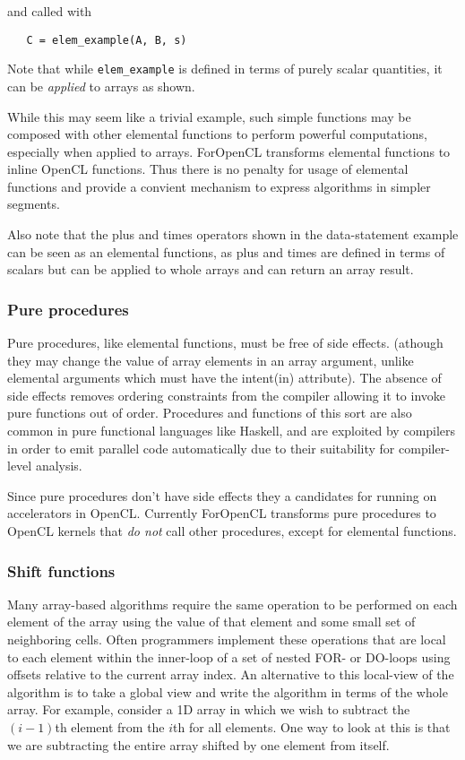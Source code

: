 and called with

\begin{verbatim}
   C = elem_example(A, B, s)
\end{verbatim}

Note that while {\tt elem\_example} is defined in terms of purely scalar
quantities, it can be \emph{applied} to arrays as shown.

While this may seem like a trivial example, such simple functions may be
composed with other elemental functions to perform powerful computations,
especially when applied to arrays.  ForOpenCL transforms elemental functions to inline OpenCL
functions.  Thus there is no penalty for usage of elemental functions and provide
a convient mechanism to express algorithms in simpler segments.

Also note that the plus and times operators shown in the data-statement
example can be seen as an elemental functions, as plus and times are defined
in terms of scalars but can be applied to whole arrays and can return an array
result.

\subsubsection*{Pure procedures}

Pure procedures, like elemental functions, must be free of side effects.
(athough they may change the value of array elements in an array argument,
unlike elemental arguments which must have the intent(in) attribute).
The absence of side effects removes ordering constraints from the compiler
allowing it to invoke pure functions out of order.  Procedures and functions
of this sort are also common in pure functional languages like Haskell,
and are exploited by compilers in order to emit parallel code automatically
due to their suitability for compiler-level analysis.

Since pure procedures don't have side effects they a candidates for running on
accelerators in OpenCL.  Currently ForOpenCL transforms pure procedures to
OpenCL kernels that \emph{do not} call other procedures, except for elemental
functions.

\subsubsection*{Shift functions}

Many array-based algorithms require the same operation to be performed
on each element of the array using the value of that element and some small
set of neighboring cells.  Often programmers implement these operations that
are local to each element within the inner-loop of a set of nested FOR-
or DO-loops using offsets relative to the current array index.  An alternative
to this local-view of the algorithm is to take a global view and write the
algorithm in terms of the whole array.  For example, consider a 1D array in
which we wish to subtract the $(i-1)$th element from the $i$th for all
elements.  One way to look at this is that we are subtracting the entire array
shifted by one element from itself.

